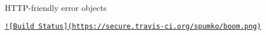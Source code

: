 \href{https://github.com/spumko}{\tt } 

H\+T\+T\+P-\/friendly error objects

\href{http://travis-ci.org/spumko/boom}{\tt !\mbox{[}Build Status\mbox{]}(https\+://secure.\+travis-\/ci.\+org/spumko/boom.\+png)} 